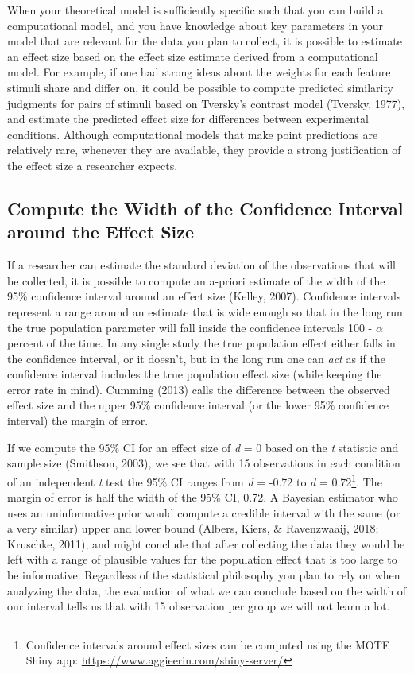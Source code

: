 \documentclass[
  english,
  ,jou, a4paper,floatsintext]{apa6}
\begin{document}
When your theoretical model is sufficiently specific such that you can build a computational model, and you have knowledge about key parameters in your model that are relevant for the data you plan to collect, it is possible to estimate an effect size based on the effect size estimate derived from a computational model. For example, if one had strong ideas about the weights for each feature stimuli share and differ on, it could be possible to compute predicted similarity judgments for pairs of stimuli based on Tversky's contrast model (Tversky, 1977), and estimate the predicted effect size for differences between experimental conditions. Although computational models that make point predictions are relatively rare, whenever they are available, they provide a strong justification of the effect size a researcher expects.

\hypertarget{compute-the-width-of-the-confidence-interval-around-the-effect-size}{%
\subsection{Compute the Width of the Confidence Interval around the Effect Size}\label{compute-the-width-of-the-confidence-interval-around-the-effect-size}}

If a researcher can estimate the standard deviation of the observations that will be collected, it is possible to compute an a-priori estimate of the width of the 95\% confidence interval around an effect size (Kelley, 2007). Confidence intervals represent a range around an estimate that is wide enough so that in the long run the true population parameter will fall inside the confidence intervals 100 - \(\alpha\) percent of the time. In any single study the true population effect either falls in the confidence interval, or it doesn't, but in the long run one can \emph{act} as if the confidence interval includes the true population effect size (while keeping the error rate in mind). Cumming (2013) calls the difference between the observed effect size and the upper 95\% confidence interval (or the lower 95\% confidence interval) the margin of error.

If we compute the 95\% CI for an effect size of \emph{d} = 0 based on the \emph{t} statistic and sample size (Smithson, 2003), we see that with 15 observations in each condition of an independent \emph{t} test the 95\% CI ranges from \emph{d} = -0.72 to \emph{d} = 0.72\footnote{Confidence intervals around effect sizes can be computed using the MOTE Shiny app: \url{https://www.aggieerin.com/shiny-server/}}. The margin of error is half the width of the 95\% CI, 0.72. A Bayesian estimator who uses an uninformative prior would compute a credible interval with the same (or a very similar) upper and lower bound (Albers, Kiers, \& Ravenzwaaij, 2018; Kruschke, 2011), and might conclude that after collecting the data they would be left with a range of plausible values for the population effect that is too large to be informative. Regardless of the statistical philosophy you plan to rely on when analyzing the data, the evaluation of what we can conclude based on the width of our interval tells us that with 15 observation per group we will not learn a lot.
\end{document}
